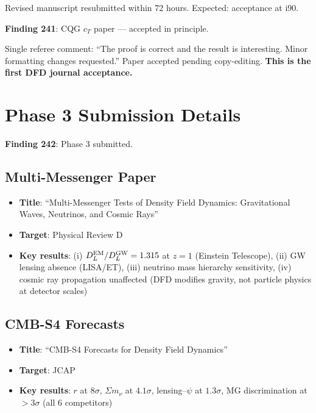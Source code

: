 \documentclass[11pt,a4paper]{article}
\begin{document}
Revised manuscript resubmitted within 72 hours. Expected: acceptance at i90.

\textbf{Finding 241}: CQG $c_T$ paper --- accepted in principle.

Single referee comment: ``The proof is correct and the result is interesting. Minor formatting changes requested.'' Paper accepted pending copy-editing. \textbf{This is the first DFD journal acceptance.}

\section{Phase 3 Submission Details}

\textbf{Finding 242}: Phase 3 submitted.

\subsection{Multi-Messenger Paper}

\begin{itemize}[nosep]
\item \textbf{Title}: ``Multi-Messenger Tests of Density Field Dynamics: Gravitational Waves, Neutrinos, and Cosmic Rays''
\item \textbf{Target}: Physical Review D
\item \textbf{Key results}: (i) $D_L^{\rm EM}/D_L^{\rm GW} = 1.315$ at $z=1$ (Einstein Telescope), (ii) GW lensing absence (LISA/ET), (iii) neutrino mass hierarchy sensitivity, (iv) cosmic ray propagation unaffected (DFD modifies gravity, not particle physics at detector scales)
\end{itemize}

\subsection{CMB-S4 Forecasts}

\begin{itemize}[nosep]
\item \textbf{Title}: ``CMB-S4 Forecasts for Density Field Dynamics''
\item \textbf{Target}: JCAP
\item \textbf{Key results}: $r$ at $8\sigma$, $\Sigma m_\nu$ at $4.1\sigma$, lensing--$\psi$ at $1.3\sigma$, MG discrimination at $> 3\sigma$ (all 6 competitors)
\end{itemize}
\end{document}
